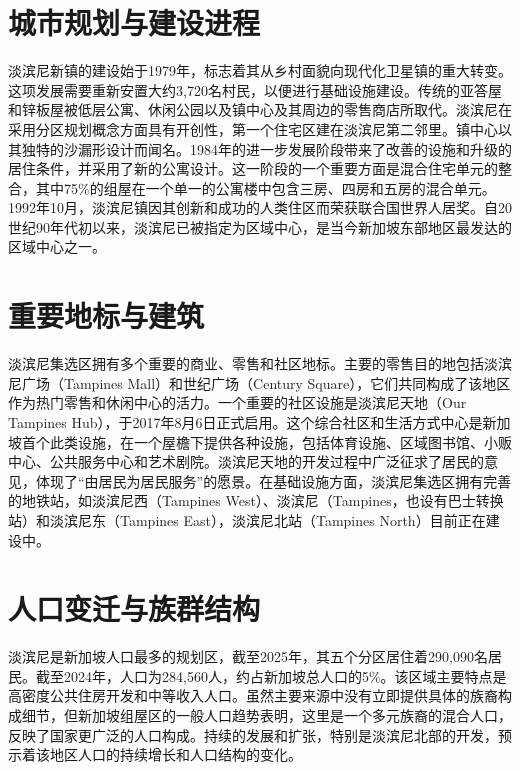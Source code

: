 \documentclass[11pt,a4paper,twoside,openany]{book}
\begin{document}
\section{城市规划与建设进程}
淡滨尼新镇的建设始于1979年，标志着其从乡村面貌向现代化卫星镇的重大转变。这项发展需要重新安置大约3,720名村民，以便进行基础设施建设。传统的亚答屋和锌板屋被低层公寓、休闲公园以及镇中心及其周边的零售商店所取代。淡滨尼在采用分区规划概念方面具有开创性，第一个住宅区建在淡滨尼第二邻里。镇中心以其独特的沙漏形设计而闻名。1984年的进一步发展阶段带来了改善的设施和升级的居住条件，并采用了新的公寓设计。这一阶段的一个重要方面是混合住宅单元的整合，其中75\%的组屋在一个单一的公寓楼中包含三房、四房和五房的混合单元。1992年10月，淡滨尼镇因其创新和成功的人类住区而荣获联合国世界人居奖。自20世纪90年代初以来，淡滨尼已被指定为区域中心，是当今新加坡东部地区最发达的区域中心之一。

\section{重要地标与建筑}
淡滨尼集选区拥有多个重要的商业、零售和社区地标。主要的零售目的地包括淡滨尼广场（Tampines Mall）和世纪广场（Century Square），它们共同构成了该地区作为热门零售和休闲中心的活力。一个重要的社区设施是淡滨尼天地（Our Tampines Hub），于2017年8月6日正式启用。这个综合社区和生活方式中心是新加坡首个此类设施，在一个屋檐下提供各种设施，包括体育设施、区域图书馆、小贩中心、公共服务中心和艺术剧院。淡滨尼天地的开发过程中广泛征求了居民的意见，体现了“由居民为居民服务”的愿景。在基础设施方面，淡滨尼集选区拥有完善的地铁站，如淡滨尼西（Tampines West）、淡滨尼（Tampines，也设有巴士转换站）和淡滨尼东（Tampines East），淡滨尼北站（Tampines North）目前正在建设中。

\section{人口变迁与族群结构}
淡滨尼是新加坡人口最多的规划区，截至2025年，其五个分区居住着290,090名居民。截至2024年，人口为284,560人，约占新加坡总人口的5\%。该区域主要特点是高密度公共住房开发和中等收入人口。虽然主要来源中没有立即提供具体的族裔构成细节，但新加坡组屋区的一般人口趋势表明，这里是一个多元族裔的混合人口，反映了国家更广泛的人口构成。持续的发展和扩张，特别是淡滨尼北部的开发，预示着该地区人口的持续增长和人口结构的变化。
\end{document}

